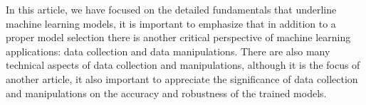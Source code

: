 
\par
In this article, we have focused on the detailed fundamentals that underline machine learning models, it is important to emphasize that in addition to a proper model selection there is another critical perspective of machine learning applications: data collection and data manipulations. There are also many technical aspects of data collection and manipulations, although it is the focus of another article, it also important to appreciate the significance of data collection and manipulations on the accuracy and robustness of the trained models.
\par 
